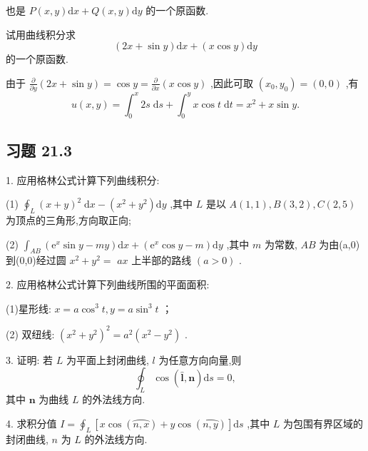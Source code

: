 也是 \(P\left( {x,y}\right) \mathrm{d}x + Q\left( {x,y}\right) \mathrm{d}y\) 的一个原函数.

\begin{example}

\end{example}
试用曲线积分求
\[
\left( {{2x} + \sin y}\right) \mathrm{d}x + \left( {x\cos y}\right) \mathrm{d}y
\]
的一个原函数.

\begin{solution}

\end{solution}
由于 \(\frac{\partial }{\partial y}\left( {{2x} + \sin y}\right)  = \cos y = \frac{\partial }{\partial x}\left( {x\cos y}\right)\) ,因此可取 \(\left( {{x}_{0},{y}_{0}}\right)  = \left( {0,0}\right)\) ,有
\[
u\left( {x,y}\right)  = {\int }_{0}^{x}{2s}\mathrm{\;d}s + {\int }_{0}^{y}x\cos t\mathrm{\;d}t = {x}^{2} + x\sin y.
\]
\subsection{习题 21.3}

1. 应用格林公式计算下列曲线积分:

(1) \({\oint }_{L}{\left( x + y\right) }^{2}\mathrm{\;d}x - \left( {{x}^{2} + {y}^{2}}\right) \mathrm{d}y\) ,其中 \(L\) 是以 \(A\left( {1,1}\right) ,B\left( {3,2}\right) ,C\left( {2,5}\right)\) 为顶点的三角形,方向取正向;

(2) \({\int }_{AB}\left( {{\mathrm{e}}^{x}\sin y - {my}}\right) \mathrm{d}x + \left( {{\mathrm{e}}^{x}\cos y - m}\right) \mathrm{d}y\) ,其中 \(m\) 为常数, \({AB}\) 为由(a,0)到(0,0)经过圆 \({x}^{2} + {y}^{2} =\)  \({ax}\) 上半部的路线 \(\left( {a > 0}\right)\) .

2. 应用格林公式计算下列曲线所围的平面面积:

(1)星形线: \(x = a{\cos }^{3}t,y = a{\sin }^{3}t\) ；

(2) 双纽线: \({\left( {x}^{2} + {y}^{2}\right) }^{2} = {a}^{2}\left( {{x}^{2} - {y}^{2}}\right)\) .

3. 证明: 若 \(L\) 为平面上封闭曲线, \(l\) 为任意方向向量,则
\[
{\oint }_{L}\cos \left( {\overset{⏜}{\mathbf{l}},\mathbf{n}}\right) \mathrm{d}s = 0,
\]
其中 \(\mathbf{n}\) 为曲线 \(L\) 的外法线方向.

4. 求积分值 \(I = {\oint }_{L}\left\lbrack  {x\cos \left( \overset{⏜}{n,x}\right)  + y\cos \left( \overset{⏜}{n,y}\right) }\right\rbrack  \mathrm{d}s\) ,其中 \(L\) 为包围有界区域的封闭曲线, \(n\) 为 \(L\) 的外法线方向.

